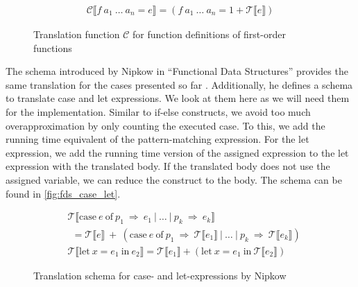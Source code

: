 \begin{figure}
\begin{align*}
    \mathcal{C}\llbracket f\ a_{1}\ \dots\ a_{n} = e\rrbracket = (f\ a_{1}\ \dots\ a_{n} = 1 + \mathcal{T}\llbracket e \rrbracket)
\end{align*}
\caption{Translation function $\mathcal{C}$ for function definitions of first-order functions}
\label{fig:first_order_C}
\end{figure}

The schema introduced by Nipkow in ``Functional Data Structures'' provides the same translation for the cases presented so far \parencite{fds}.
Additionally, he defines a schema to translate case and let expressions.
We look at them here as we will need them for the implementation.
Similar to if-else constructs, we avoid too much overapproximation by only counting the executed case.
To this, we add the running time equivalent of the pattern-matching expression.
For the let expression, we add the running time version of the assigned expression to the let expression with the translated body.
If the translated body does not use the assigned variable, we can reduce the construct to the body.
The schema can be found in \autoref{fig:fds_case_let}.
\begin{figure}
  \begin{align*}
    &\mathcal{T}\llbracket \text{case}\ e\ \text{of}\ p_{1}\ \Rightarrow\ e_{1}\ |\ \dots\ |\ p_{k}\ \Rightarrow\ e_{k}\rrbracket\\
    &\ \ = \mathcal{T}\llbracket e \rrbracket\ +\ (\text{case}\ e\ \text{of}\ p_{1}\ \Rightarrow\ \mathcal{T}\llbracket e_{1}\rrbracket\ |\ \dots\ |\ p_{k}\ \Rightarrow\ \mathcal{T}\llbracket e_{k}\rrbracket)\\
    &\mathcal{T}\llbracket\text{let}\ x = e_{1}\ \text{in}\ e_{2}\rrbracket = \mathcal{T}\llbracket e_{1}\rrbracket + (\text{let}\ x = e_{1}\ \text{in}\ \mathcal{T}\llbracket e_{2}\rrbracket)
  \end{align*}
  \caption{Translation schema for case- and let-expressions by Nipkow}
  \label{fig:fds_case_let}
\end{figure}
